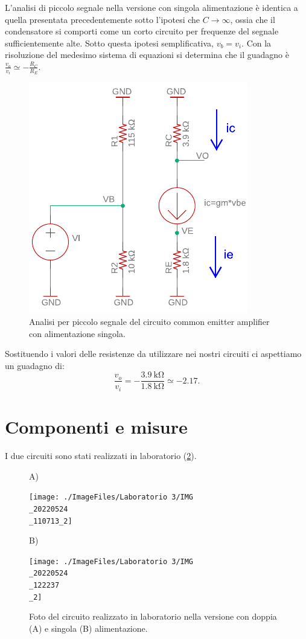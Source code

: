 \noindent
L'analisi di piccolo segnale nella versione con singola alimentazione è identica a quella presentata precedentemente sotto l'ipotesi che $C\to\infty$, ossia che il condensatore si comporti come un corto circuito per frequenze del segnale sufficientemente alte. Sotto questa ipotesi semplificativa, $v_b=v_i$. Con la risoluzione del medesimo sistema di equazioni si determina che il guadagno è $\frac{v_o}{v_i}\simeq-\frac{R_C}{R_E}.$
\begin{figure}[h!]
	\centering
	\includegraphics[width=0.4\linewidth]{./OtherFiles/Laboratorio 3/common emitter_se-piccolo segnale-printout}
	\caption{Analisi per piccolo segnale del circuito common emitter amplifier con alimentazione singola.}
	\label{fig:commonemitter_se_AC}
\end{figure}

\noindent
Sostituendo i valori delle resistenze da utilizzare nei nostri circuiti ci aspettiamo un guadagno di:
\begin{equation}
	\frac{v_o}{v_i}=-\frac{\SI{3.9}{\kilo\ohm}}{\SI{1.8}{\kilo\ohm}}\simeq -2.17.
\end{equation}

\section{Componenti e misure}
I due circuiti sono stati realizzati in laboratorio (\Fig\ref{fig:commonemitter_circuito}).
\begin{figure}[h!]
	\centering
	A)
	
	\texttt{[image: ./ImageFiles/Laboratorio 3/IMG\\\_20220524\\\_110713\_2]}
	
	B)
	
	\texttt{[image: ./ImageFiles/Laboratorio 3/IMG\\\_20220524\\\_122237\\\_2]}
	\caption{Foto del circuito realizzato in laboratorio nella versione con doppia (A) e singola (B) alimentazione.}
	\label{fig:commonemitter_circuito}
\end{figure}

